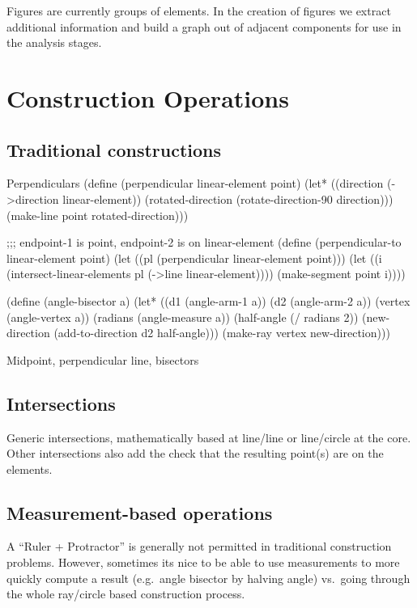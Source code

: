 Figures are currently groups of elements. In the creation of figures
we extract additional information and build a graph out of adjacent
components for use in the analysis stages.

\section{Construction Operations}

\subsection{Traditional constructions}

\begin{code-listing}{Perpendiculars}
(define (perpendicular linear-element point)
  (let* ((direction (->direction linear-element))
         (rotated-direction (rotate-direction-90 direction)))
    (make-line point rotated-direction)))

;;; endpoint-1 is point, endpoint-2 is on linear-element
(define (perpendicular-to linear-element point)
  (let ((pl (perpendicular linear-element point)))
    (let ((i (intersect-linear-elements pl (->line linear-element))))
      (make-segment point i))))

(define (angle-bisector a)
  (let* ((d1 (angle-arm-1 a))
         (d2 (angle-arm-2 a))
         (vertex (angle-vertex a))
         (radians (angle-measure a))
         (half-angle (/ radians 2))
         (new-direction (add-to-direction d2 half-angle)))
    (make-ray vertex new-direction)))
\end{code-listing}

Midpoint, perpendicular line, bisectors

\subsection{Intersections}

Generic intersections, mathematically based at line/line or
line/circle at the core. Other intersections also add the check that
the resulting point(s) are on the elements.

\subsection{Measurement-based operations}

A ``Ruler + Protractor'' is generally not permitted in traditional
construction problems. However, sometimes its nice to be able to use
measurements to more quickly compute a result (e.g.\ angle bisector by
halving angle) vs.\ going through the whole ray/circle based
construction process.

